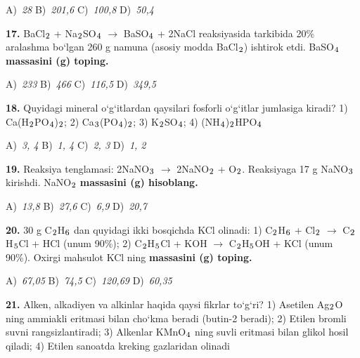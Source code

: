 \documentclass[11pt,a4paper]{article}
\renewcommand{\textsubscript}[1]{\ensuremath{_{\text{\fontsize{8}{8}\selectfont #1}}}}
\begin{document}
\begin{multicols}{2}
\noindent A)~\textsl{28} \hfill B)~\textsl{201,6} \hfill C)~\textsl{100,8} \hfill D)~\textsl{50,4}\par
\vspace{4pt}
\noindent\textbf{17.} BaCl\textsubscript{2} + Na\textsubscript{2}SO\textsubscript{4} $\to$ BaSO\textsubscript{4} + 2NaCl reaksiyasida tarkibida 20\% aralashma bo`lgan 260 g namuna (asosiy modda BaCl\textsubscript{2}) ishtirok etdi. BaSO\textsubscript{4} \textbf{massasini (g) toping.}

\noindent A)~\textsl{233} \hfill B)~\textsl{466} \hfill C)~\textsl{116,5} \hfill D)~\textsl{349,5}\par
\vspace{4pt}
\noindent\textbf{18.} Quyidagi mineral o`g`itlardan qaysilari fosforli o`g`itlar jumlasiga kiradi? 1) Ca(H\textsubscript{2}PO\textsubscript{4})\textsubscript{2}; 2) Ca\textsubscript{3}(PO\textsubscript{4})\textsubscript{2}; 3) K\textsubscript{2}SO\textsubscript{4}; 4) (NH\textsubscript{4})\textsubscript{2}HPO\textsubscript{4}

\noindent A)~\textsl{3, 4} \hfill B)~\textsl{1, 4} \hfill C)~\textsl{2, 3} \hfill D)~\textsl{1, 2}\par
\vspace{4pt}
\noindent\textbf{19.} Reaksiya tenglamasi: 2NaNO\textsubscript{3} $\to$ 2NaNO\textsubscript{2} + O\textsubscript{2}. Reaksiyaga 17 g NaNO\textsubscript{3} kirishdi. NaNO\textsubscript{2} \textbf{massasini (g) hisoblang.}

\noindent A)~\textsl{13,8} \hfill B)~\textsl{27,6} \hfill C)~\textsl{6,9} \hfill D)~\textsl{20,7}\par
\vspace{4pt}
\noindent\textbf{20.} 30 g C\textsubscript{2}H\textsubscript{6} dan quyidagi ikki bosqichda KCl olinadi: 1) C\textsubscript{2}H\textsubscript{6} + Cl\textsubscript{2} $\to$ C\textsubscript{2}H\textsubscript{5}Cl + HCl (unum 90\%); 2) C\textsubscript{2}H\textsubscript{5}Cl + KOH $\to$ C\textsubscript{2}H\textsubscript{5}OH + KCl (unum 90\%). Oxirgi mahsulot KCl ning \textbf{massasini (g) toping.}

\noindent A)~\textsl{67,05} \hfill B)~\textsl{74,5} \hfill C)~\textsl{120,69} \hfill D)~\textsl{60,35}\par
\vspace{4pt}
\noindent\textbf{21.} Alken, alkadiyen va alkinlar haqida qaysi fikrlar to`g`ri? 1) Asetilen Ag\textsubscript{2}O ning ammiakli eritmasi bilan cho`kma beradi (butin-2 beradi); 2) Etilen bromli suvni rangsizlantiradi; 3) Alkenlar KMnO\textsubscript{4} ning suvli eritmasi bilan glikol hosil qiladi; 4) Etilen sanoatda kreking gazlaridan olinadi


\end{multicols}
\end{document}

